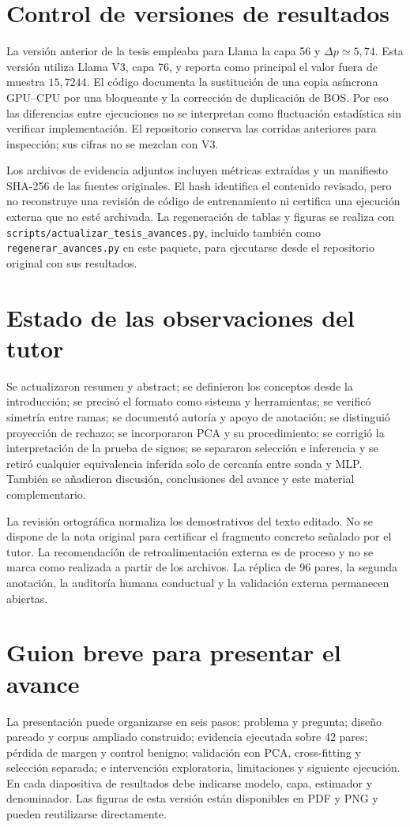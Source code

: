 \section{Control de versiones de resultados}

La versión anterior de la tesis empleaba para Llama la capa 56 y $\Delta p\simeq5{,}74$. Esta versión utiliza Llama V3, capa 76, y reporta como principal el valor fuera de muestra $15{,}7244$. El código documenta la sustitución de una copia asíncrona GPU--CPU por una bloqueante y la corrección de duplicación de BOS. Por eso las diferencias entre ejecuciones no se interpretan como fluctuación estadística sin verificar implementación. El repositorio conserva las corridas anteriores para inspección; sus cifras no se mezclan con V3.

Los archivos de evidencia adjuntos incluyen métricas extraídas y un manifiesto SHA-256 de las fuentes originales. El hash identifica el contenido revisado, pero no reconstruye una revisión de código de entrenamiento ni certifica una ejecución externa que no esté archivada. La regeneración de tablas y figuras se realiza con \texttt{scripts/actualizar\_tesis\_avances.py}, incluido también como \texttt{regenerar\_avances.py} en este paquete, para ejecutarse desde el repositorio original con sus resultados.

\section{Estado de las observaciones del tutor}

Se actualizaron resumen y abstract; se definieron los conceptos desde la introducción; se precisó el formato como sistema y herramientas; se verificó simetría entre ramas; se documentó autoría y apoyo de anotación; se distinguió proyección de rechazo; se incorporaron PCA y su procedimiento; se corrigió la interpretación de la prueba de signos; se separaron selección e inferencia y se retiró cualquier equivalencia inferida solo de cercanía entre sonda y MLP. También se añadieron discusión, conclusiones del avance y este material complementario.

La revisión ortográfica normaliza los demostrativos del texto editado. No se dispone de la nota original para certificar el fragmento concreto señalado por el tutor. La recomendación de retroalimentación externa es de proceso y no se marca como realizada a partir de los archivos. La réplica de 96 pares, la segunda anotación, la auditoría humana conductual y la validación externa permanecen abiertas.

\section{Guion breve para presentar el avance}

La presentación puede organizarse en seis pasos: problema y pregunta; diseño pareado y corpus ampliado construido; evidencia ejecutada sobre 42 pares; pérdida de margen y control benigno; validación con PCA, cross-fitting y selección separada; e intervención exploratoria, limitaciones y siguiente ejecución. En cada diapositiva de resultados debe indicarse modelo, capa, estimador y denominador. Las figuras de esta versión están disponibles en PDF y PNG y pueden reutilizarse directamente.
